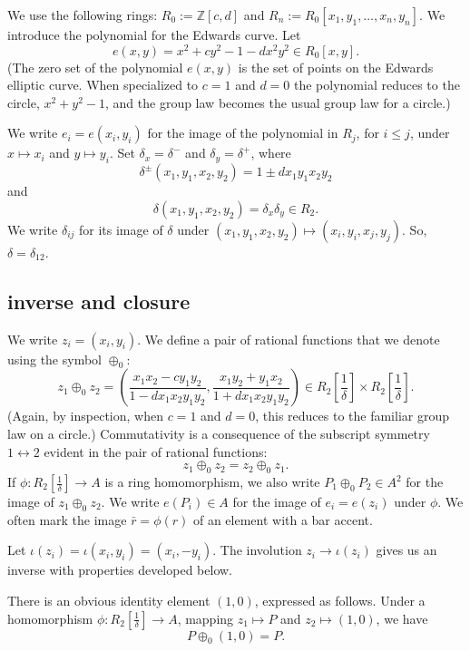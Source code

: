 \documentclass{llncs}
\newcommand{\ring}[1]{\mathbb{#1}}
\newcommand{\f}[1]{\frac{1}{#1}}
\begin{document}
We use the following rings: $R_0 := \ring{Z}[c,d]$ and $R_n :=
R_0[x_1,y_1,\ldots,x_n,y_n]$.  We introduce the polynomial for the
Edwards curve.  Let
\begin{equation}
e(x,y) = x^2 + c y^2 -1 - d x^2 y^2 \in  R_0[x,y].
\end{equation}
(The zero set of the polynomial $e(x,y)$ is the set of points on the
Edwards elliptic curve.  When specialized to $c=1$ and $d=0$ the
polynomial reduces to the circle, $x^2 + y^2 - 1$, and the group law
becomes the usual group law for a circle.)

We write $e_i = e(x_i,y_i)$ for the image of the polynomial in $R_j$,
for $i\le j$, under $x\mapsto x_i$ and $y\mapsto y_i$.  Set
$\delta_x = \delta^-$ and $\delta_y = \delta^+$, where
\[\delta^{\pm} (x_1,y_1,x_2,y_2) = 1\pm d x_1 y_1 x_2 y_2\] and
\[
\delta(x_1,y_1,x_2,y_2) = \delta_x\delta_y\in R_2.
\]
We write $\delta_{ij}$ for its image of $\delta$ under
$(x_1,y_1,x_2,y_2)\mapsto (x_i,y_i,x_j,y_j)$.  So,
$\delta=\delta_{12}$.

\subsection{inverse and closure}

We write $z_i = (x_i,y_i)$.
We define a pair of rational functions that we denote using
the symbol $\oplus_0$:
\begin{equation}\label{eqn:add}
z_1 \oplus_0 z_2 =  \left(\frac{x_1 x_2 - c y_1 y_2}{1 - d x_1 x_2 y_1 y_2},
\frac{x_1 y_2 + y_1 x_2}{1+d x_1 x_2 y_1 y_2}\right) 
\in R_2[\f{\delta}]\times R_2[\f{\delta}].
\end{equation}
(Again, by inspection, when $c=1$ and $d=0$, this reduces to the familiar group
law on a circle.)
Commutativity is a consequence of the subscript symmetry
$1\leftrightarrow 2$ evident in the pair of rational functions:
\[
z_1 \oplus_0 z_2 = z_2\oplus_0 z_1.
\]
If $\phi:R_2[\f{\delta}]\to A$ is a ring homomorphism, we also write
$P_1\oplus_0 P_2\in A^2$ for the image of $z_1\oplus_0 z_2$.  We write
$e(P_i)\in A$ for the image of $e_i=e(z_i)$ under $\phi$.  We often
mark the image $\bar r=\phi(r)$ of an element with a bar accent.

Let $\iota(z_i) =\iota(x_i,y_i) = (x_i,-y_i)$.  The involution $z_i\to \iota(z_i)$ gives us an inverse
with properties developed below.

There is an obvious identity element $(1,0)$, expressed as follows.
Under a homomorphism $\phi:R_2[\f{\delta}]\to A$, mapping $z_1\mapsto
P$ and $z_2\mapsto (1,0)$, we have
\begin{equation}
P\oplus_0(1,0) = P.
\end{equation}
\end{document}
